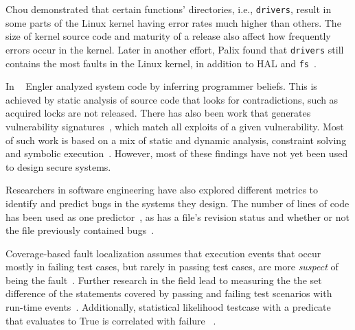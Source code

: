 Chou \cite{PittSFIeld} demonstrated that certain functions' directories, i.e., \texttt{drivers}, result in some parts of the Linux kernel having error rates much higher than others. The size of kernel source code and maturity of a release also affect how frequently errors occur in the kernel. Later in another effort, Palix found that \texttt{drivers} still contains the most faults in
the Linux kernel, in addition to HAL and \texttt{fs}~\cite{palix2011faults}.


In ~\cite{engler2001bugs} Engler analyzed system code by inferring programmer
beliefs.  This is achieved by static analysis
of source code that looks for contradictions, such as acquired locks are
not released. There has also been work that generates vulnerability
signatures~\cite{brumley2006towards}, which match all exploits
of a given vulnerability. Most of such work is based on a mix of static and
dynamic analysis, constraint solving and symbolic execution~\cite{chou2003static}.
However, most of these findings have not yet been used to design
secure systems.

Researchers in software engineering have also explored different metrics to identify and predict bugs in the systems they design. The number of lines of code has been used as one predictor~\cite{Bug-Location}, as has a file's revision status and
whether or not the file previously contained bugs~\cite{Bug-Location, lewis2013does}. 


Coverage-based fault localization assumes that execution events that occur mostly in failing
test cases, but rarely in passing test cases, are more \textit{suspect}
of being the fault~\cite{jones2002visualization}. Further research in the field lead to measuring the the set difference of the statements covered by passing and failing test scenarios with run-time events~\cite{agrawal1995fault, jones2005empirical}. Additionally, statistical likelihood testcase with a predicate that evaluates to True is correlated with failure ~\cite{liblit2005scalable}.


